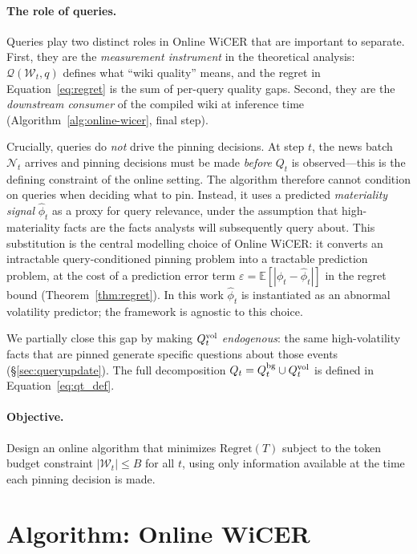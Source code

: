 \documentclass{article}
\newcommand{\wt}{\mathcal{W}_t}
\newcommand{\nt}{\mathcal{N}_t}
\begin{document}
\paragraph{The role of queries.}
Queries play two distinct roles in Online WiCER that are important to separate.
First, they are the \emph{measurement instrument} in the theoretical analysis: $\mathcal{Q}(\wt, q)$ defines what ``wiki quality'' means, and the regret in Equation~\eqref{eq:regret} is the sum of per-query quality gaps.
Second, they are the \emph{downstream consumer} of the compiled wiki at inference time (Algorithm~\ref{alg:online-wicer}, final step).

Crucially, queries do \emph{not} drive the pinning decisions.
At step $t$, the news batch $\nt$ arrives and pinning decisions must be made \emph{before} $Q_t$ is observed---this is the defining constraint of the online setting.
The algorithm therefore cannot condition on queries when deciding what to pin.
Instead, it uses a predicted \emph{materiality signal} $\hat{\phi}_t$ as a proxy for query relevance, under the assumption that high-materiality facts are the facts analysts will subsequently query about.
This substitution is the central modelling choice of Online WiCER: it converts an intractable query-conditioned pinning problem into a tractable prediction problem, at the cost of a prediction error term $\varepsilon = \mathbb{E}[|\phi_t - \hat{\phi}_t|]$ in the regret bound (Theorem~\ref{thm:regret}).
In this work $\hat{\phi}_t$ is instantiated as an abnormal volatility predictor; the framework is agnostic to this choice.

We partially close this gap by making $Q_t^{\textup{vol}}$ \emph{endogenous}: the same high-volatility facts that are pinned generate specific questions about those events (\S\ref{sec:queryupdate}).
The full decomposition $Q_t = Q_t^{\textup{bg}} \cup Q_t^{\textup{vol}}$ is defined in Equation~\eqref{eq:qt_def}.

\paragraph{Objective.}
Design an online algorithm that minimizes $\text{Regret}(T)$ subject to the token budget constraint $|\wt| \leq B$ for all $t$, using only information available at the time each pinning decision is made.

\section{Algorithm: Online WiCER}
\label{sec:algorithm}
\end{document}
